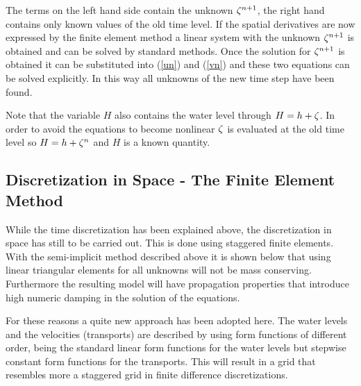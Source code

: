 The terms on the left hand side contain the unknown $\mbox{$\zeta^{n+1}$}$, the right hand
contains only known values of the old time level. If the spatial derivatives
are now expressed by the finite element method a linear system with the unknown
$\mbox{$\zeta^{n+1}$}$ is obtained and can be solved by standard methods. Once the solution
for $\mbox{$\zeta^{n+1}$}$ is obtained it can be substituted into (\ref{un}) and (\ref{vn})
and these two equations can be solved explicitly. In this way all unknowns
of the new time step have been found.

Note that the variable $H$ also contains the water level through
$H=h+\zeta$. In order to avoid the equations to become nonlinear $\zeta$
is evaluated at the old time level so $H=h+\mbox{$\zeta^{n}$}$ and $H$ is a known quantity.









\subsection{Discretization in Space - The Finite Element Method}


While the time discretization has been explained above, the discretization
in space has still to be carried out. This is done 
using staggered finite elements. 
With the semi-implicit method described above
it is shown below that using linear triangular elements
for all unknowns 
will not be mass conserving. Furthermore the resulting model
will have propagation properties that introduce high numeric damping
in the solution of the equations.

For these reasons a quite new approach has been adopted here. The water
levels and the velocities (transports) are described by using form
functions of different order, being the standard linear form functions
for the water levels but stepwise constant form functions for the
transports. This will result in a grid that resembles more a staggered
grid in finite difference discretizations.

